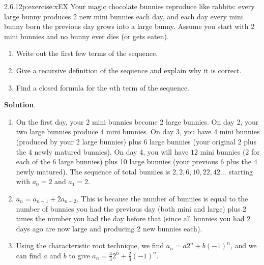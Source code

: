 \documentclass[twoside,11pt,]{book}
\newcommand{\blocktitlefont}{\relax}
\numberwithin{equation}{chapter}
\begin{document}
\begin{divisionsolution}{2.6.12}{}{p:exercise:xEX}%
Your magic chocolate bunnies  reproduce like rabbits: every large bunny produces 2 new mini bunnies each day, and each day every mini bunny born the previous day grows into a large bunny. Assume you start with 2 mini bunnies and no bunny ever dies (or gets eaten).%
\begin{enumerate}[label=(\alph*)]
\item{}Write out the first few terms of the sequence.%
\item{}Give a recursive definition of the sequence and explain why it is correct.%
\item{}Find a closed formula for the \(n\)th term of the sequence.%
\end{enumerate}
%
\par\smallskip%
\noindent\textbf{\blocktitlefont Solution}.\quad{}%
\begin{enumerate}[label=(\alph*)]
\item{}On the first day, your 2 mini bunnies become 2 large bunnies. On day 2, your two large bunnies produce 4 mini bunnies. On day 3, you have 4 mini bunnies (produced by your 2 large bunnies) plus 6 large bunnies (your original 2 plus the 4 newly matured bunnies). On day 4, you will have \(12\) mini bunnies (2 for each of the 6 large bunnies) plus 10 large bunnies (your previous 6 plus the 4 newly matured). The sequence of total bunnies is \(2, 2, 6, 10, 22, 42\ldots\) starting with \(a_0 = 2\) and \(a_1 = 2\).%
\item{}\(a_n = a_{n-1} + 2a_{n-2}\). This is because the number of bunnies is equal to the number of bunnies you had the previous day (both mini and large) plus 2 times the number you had the day before that (since all bunnies you had 2 days ago are now large and producing 2 new bunnies each).%
\item{}Using the characteristic root technique, we find \(a_n = a2^n + b(-1)^n\), and we can find \(a\) and \(b\) to give \(a_n = \frac{4}{3}2^n + \frac{2}{3}(-1)^n\).%
\end{enumerate}
%
\end{divisionsolution}%
\end{document}
